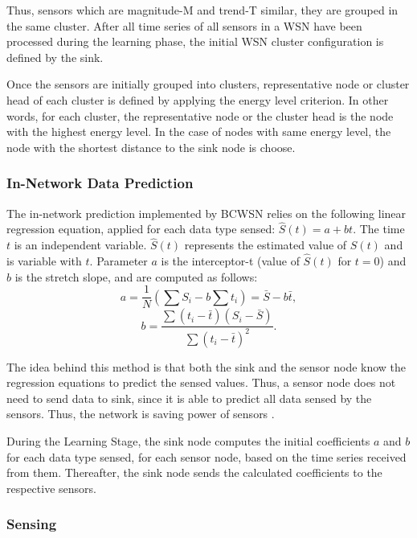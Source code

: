 \documentclass[conference]{IEEEtran}
\begin{document}
Thus, sensors which are magnitude-M and trend-T similar, they are grouped in the
same cluster. After all time series of all sensors in a WSN have been processed
during the learning phase, the initial WSN cluster configuration is defined by
the sink.

Once the sensors are initially grouped into clusters, representative node or
cluster head of each cluster is defined by applying the energy level criterion.
In other words, for each cluster, the representative node or the cluster head
is the node with the highest energy level. In the case of nodes with same energy
level, the node with the shortest distance to the sink node is choose.


\subsubsection{In-Network Data Prediction}
\label{data-predict}


The in-network prediction implemented by BCWSN relies on the
following linear regression equation, applied for each data type sensed:
$\hat{S}(t) = a + bt$.
The time $t$ is an independent variable. $\hat{S}(t)$ represents the estimated
value of $S(t)$ and is variable with $t$. Parameter $a$ is the interceptor-t
(value of $\hat{S}(t)$ for $t=0$) and $b$ is the stretch slope, and are computed
as follows:
\begin{equation}
	a = \frac{1}{N}\left(\sum S_{i} - b\sum t_{i} \right) = \bar{S} - b\bar{t},
\end{equation}
\vspace*{-.3cm}
\begin{equation}
	b = \frac{\sum \left(t_{i} - \bar{t}\right)\left(S_{i} - \bar{S}\right)}{\sum \left(t_{i} - \bar{t}\right)^{2}}.
\end{equation}

The idea behind this method is that both the sink and the sensor node know the
regression equations to predict the sensed values. Thus, a sensor node does not
need to send data to sink, since it is able to predict all data sensed by the
sensors. Thus, the network is saving power of sensors \cite{MaiaACR2013}.

During the Learning Stage, the sink node computes the initial coefficients $a$
and $b$ for each data type sensed, for each sensor node, based on the time
series received from them.
Thereafter, the sink node sends the calculated coefficients to the respective
sensors.

 
\subsubsection{Sensing}
\end{document}
